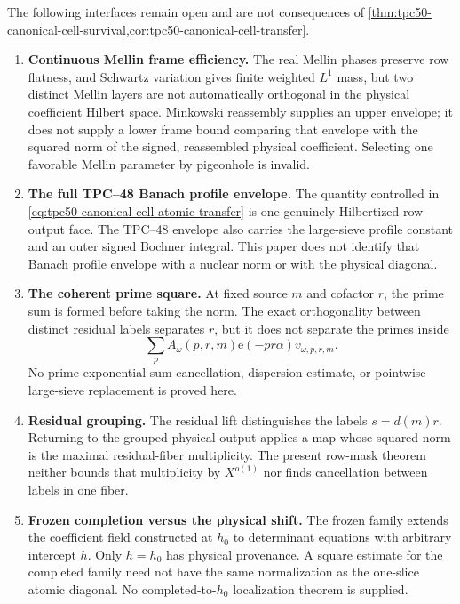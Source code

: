The following interfaces remain open and are not consequences of
\cref{thm:tpc50-canonical-cell-survival,cor:tpc50-canonical-cell-transfer}.
\begin{enumerate}[label=\textup{(\roman*)},leftmargin=2.6em]
 \item \textbf{Continuous Mellin frame efficiency.}
 The real Mellin phases preserve row flatness, and Schwartz variation
 gives finite weighted \(L^1\) mass, but two distinct Mellin layers are
 not automatically orthogonal in the physical coefficient Hilbert
 space.  Minkowski reassembly supplies an upper envelope; it does not
 supply a lower frame bound comparing that envelope with the squared
 norm of the signed, reassembled physical coefficient.  Selecting one
 favorable Mellin parameter by pigeonhole is invalid.

 \item \textbf{The full TPC--48 Banach profile envelope.}
 The quantity controlled in
 \eqref{eq:tpc50-canonical-cell-atomic-transfer} is one genuinely
 Hilbertized row-output face.  The TPC--48 envelope also carries the
 large-sieve profile constant and an outer signed Bochner integral.
 This paper does not identify that Banach profile envelope with a
 nuclear norm or with the physical diagonal.

 \item \textbf{The coherent prime square.}
 At fixed source \(m\) and cofactor \(r\), the prime sum is formed before
 taking the norm.  The exact orthogonality between distinct residual
 labels separates \(r\), but it does not separate the primes inside
 \begin{equation}
  \sum_p A_\omega(p,r,m)\mathrm e(-pr\alpha)
       v_{\omega,p,r,m}.
  \label{eq:tpc50-open-coherent-prime-sum}
 \end{equation}
 No prime exponential-sum cancellation, dispersion estimate, or
 pointwise large-sieve replacement is proved here.

 \item \textbf{Residual grouping.}
 The residual lift distinguishes the labels \(s=d(m)r\).  Returning to
 the grouped physical output applies a map whose squared norm is the
 maximal residual-fiber multiplicity.  The present row-mask theorem
 neither bounds that multiplicity by \(X^{o(1)}\) nor finds cancellation
 between labels in one fiber.

 \item \textbf{Frozen completion versus the physical shift.}
 The frozen family extends the coefficient field constructed at
 \(h_0\) to determinant equations with arbitrary intercept \(h\).  Only
 \(h=h_0\) has physical provenance.  A square estimate for the completed
 family need not have the same normalization as the one-slice atomic
 diagonal.  No completed-to-\(h_0\) localization theorem is supplied.


\end{enumerate}
